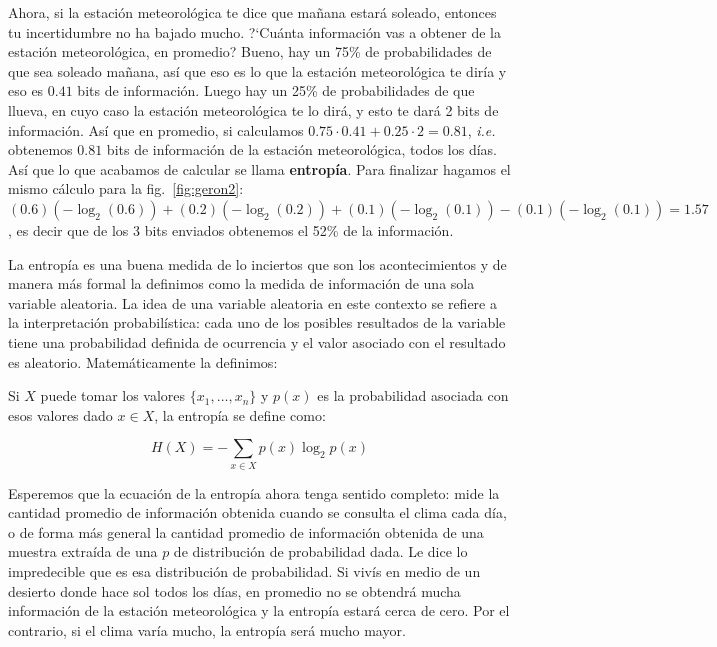 \documentclass[a4paper,12pt]{article}
\begin{document}
Ahora, si la estación meteorológica te dice que mañana estará soleado, entonces tu incertidumbre no ha bajado mucho. ?`Cuánta información vas a obtener de la estación meteorológica, en promedio? Bueno, hay un 75\% de probabilidades de que sea soleado mañana, así que eso es lo que la estación meteorológica te diría y eso es $0.41$ bits de información. Luego hay un 25\% de probabilidades de que llueva, en cuyo caso la estación meteorológica te lo dirá, y esto te dará 2 bits de información. Así que en promedio, si calculamos $0.75\cdot 0.41 + 0.25 \cdot 2 = 0.81$, \textit{i.e.} obtenemos $0.81$ bits de información de la estación meteorológica, todos los días. Así que lo que acabamos de calcular se llama \textbf{entropía}. Para finalizar hagamos el mismo cálculo para la fig.~\ref{fig:geron2}: $(0.6)(-\log_2(0.6))+(0.2)(-\log_2(0.2))+(0.1)(-\log_2(0.1))-(0.1)(-\log_2(0.1))=1.57$, es decir que de los 3 bits enviados obtenemos el 52\% de la información. 

La entropía es una buena medida de lo inciertos que son los acontecimientos y de manera más formal la definimos como la medida de información de una sola variable aleatoria. La idea de una variable aleatoria en este contexto se refiere a la interpretación probabilística: cada uno de los posibles resultados de la variable tiene una probabilidad definida de ocurrencia y el valor asociado con el resultado es aleatorio. Matemáticamente la definimos:

Si $X$ puede tomar los valores $\{x_1, \dots, x_n\}$ y $p(x)$ es la probabilidad asociada con esos valores dado $x \in X$, la entropía se define como:

$$H(X) = - \sum_{x \in X} p(x) \log_2 p(x)$$

Esperemos que la ecuación de la entropía ahora tenga sentido completo: mide la cantidad promedio de información obtenida cuando se consulta el clima cada día, o  de forma más general la cantidad promedio de información obtenida de una muestra extraída de una $p$ de distribución de probabilidad dada. Le dice lo impredecible que es esa distribución de probabilidad. Si vivís en medio de un desierto donde hace sol todos los días, en promedio no se obtendrá mucha información de la estación meteorológica y la entropía estará cerca de cero. Por el contrario, si el clima varía mucho, la entropía será mucho mayor.

\end{document}
